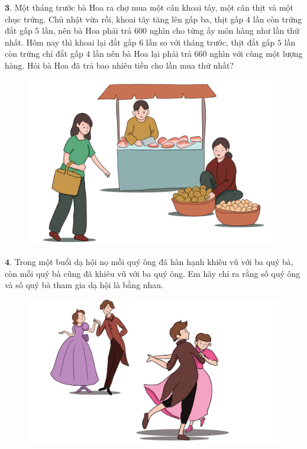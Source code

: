 \begin{multicols}{2}
\begin{figure}[H]
		\vspace*{-5pt}
	\end{figure}
	$\pmb{3.}$ Một tháng trước bà Hoa ra chợ mua một cân khoai tây, một cân thịt và một chục trứng. Chủ nhật vừa rồi, khoai tây tăng lên gấp ba, thịt gấp $4$ lần còn trứng đắt gấp $5$ lần, nên bà Hoa phải trả $600$ nghìn cho từng ấy món hàng như lần thứ nhất. Hôm nay thì khoai lại đắt gấp $6$ lần so với tháng trước, thịt đắt gấp $5$ lần còn trứng chỉ đắt gấp $4$ lần nên bà Hoa lại phải trả $660$ nghìn với cùng một lượng hàng. Hỏi bà Hoa đã trả bao nhiêu tiền cho lần mua thứ nhất?
	\begin{figure}[H]
		\centering
		\vspace*{-10pt}
		\captionsetup{labelformat= empty, justification=centering}
		\includegraphics[width=0.9\linewidth]{Pi1_2_Bai3}
		\vspace*{-10pt}
	\end{figure}
	$\pmb{4.}$ Trong một buổi dạ hội nọ mỗi quý ông đã hân hạnh khiêu vũ với ba quý bà, còn mỗi quý bà cũng đã khiêu vũ với ba quý ông. Em hãy chỉ ra rằng số quý ông và số quý bà tham gia dạ hội là bằng nhau.
	\begin{figure}[H]
		\centering
		\vspace*{-5pt}
		\captionsetup{labelformat= empty, justification=centering}
		\includegraphics[width=1\linewidth]{Pi1_2_Bai4}

\end{figure}
\end{multicols}
